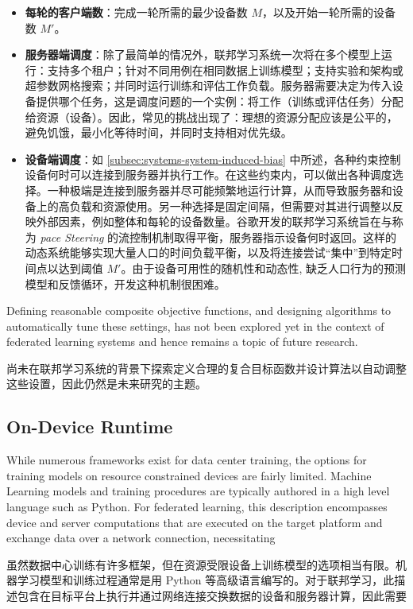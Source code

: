 \begin{itemize}
    \item \textbf{每轮的客户端数}：完成一轮所需的最少设备数 $M$，以及开始一轮所需的设备数 $M'$。
    \item \textbf{服务器端调度}：除了最简单的情况外，联邦学习系统一次将在多个模型上运行：支持多个租户；针对不同用例在相同数据上训练模型；支持实验和架构或超参数网格搜索；并同时运行训练和评估工作负载。服务器需要决定为传入设备提供哪个任务，这是调度问题的一个实例：将工作（训练或评估任务）分配给资源（设备）。因此，常见的挑战出现了：理想的资源分配应该是公平的，避免饥饿，最小化等待时间，并同时支持相对优先级。
    \item \textbf{设备端调度}：如 \cref{subsec:systems-system-induced-bias} 中所述，各种约束控制设备何时可以连接到服务器并执行工作。在这些约束内，可以做出各种调度选择。一种极端是连接到服务器并尽可能频繁地运行计算，从而导致服务器和设备上的高负载和资源使用。另一种选择是固定间隔，但需要对其进行调整以反映外部因素，例如整体和每轮的设备数量。谷歌开发的联邦学习系统旨在与称为 \textit{pace Steering} \citep{bonawitz19sysml} 的流控制机制取得平衡，服务器指示设备何时返回。这样的动态系统能够实现大量人口的时间负载平衡，以及将连接尝试“集中”到特定时间点以达到阈值 $M'$。由于设备可用性的随机性和动态性, 缺乏人口行为的预测模型和反馈循环，开发这种机制很困难。
\end{itemize}
 
Defining reasonable composite objective functions, and designing algorithms to automatically tune these settings, has not been explored yet in the context of federated learning systems and hence remains a topic of future research.

尚未在联邦学习系统的背景下探索定义合理的复合目标函数并设计算法以自动调整这些设置，因此仍然是未来研究的主题。

\subsection{On-Device Runtime}
\label{subsec:systems-on-device-runtime}
While numerous frameworks exist for data center training, the options for training models on resource constrained devices are fairly limited. Machine Learning models and training procedures are typically authored in a high level language such as Python. For federated learning, this description encompasses device and server computations that are executed on the target platform and exchange data over a network connection, necessitating

虽然数据中心训练有许多框架，但在资源受限设备上训练模型的选项相当有限。机器学习模型和训练过程通常是用 Python 等高级语言编写的。对于联邦学习，此描述包含在目标平台上执行并通过网络连接交换数据的设备和服务器计算，因此需要



